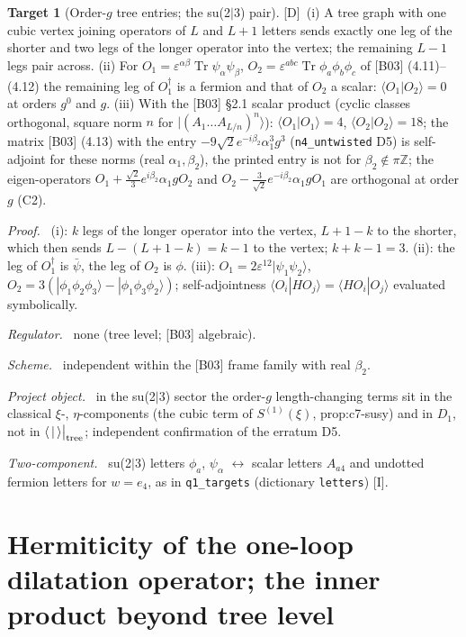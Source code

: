 \documentclass[11pt]{article}
\theoremstyle{definition}
\newtheorem{target}{Target}
\newcommand{\Tr}{\operatorname{Tr}}
\newcommand{\Dl}{\textup{[D]}}
\newcommand{\Il}{\textup{[I]}}
\newcommand{\tree}{\big|_{\rm tree}}
\newcommand{\fld}[1]{\par\textit{#1.}\ }
\begin{document}
\begin{target}[Order-$g$ tree entries; the su(2$|$3) pair]\label{t:legs}
\Dl\ (i) A tree graph with one cubic vertex joining operators of $L$ and $L+1$ letters sends exactly one leg of the shorter and two legs of the longer operator into the vertex; the remaining $L-1$ legs pair across. (ii) For $O_1=\varepsilon^{\alpha\beta}\Tr\psi_\alpha\psi_\beta$, $O_2=\varepsilon^{abc}\Tr\phi_a\phi_b\phi_c$ of [B03] (4.11)--(4.12) the remaining leg of $O_1^\dagger$ is a fermion and that of $O_2$ a scalar: $\langle O_1|O_2\rangle=0$ at orders $g^0$ and $g$. (iii) With the [B03] \S2.1 scalar product (cyclic classes orthogonal, square norm $n$ for $|(A_1\dots A_{L/n})^n\rangle$): $\langle O_1|O_1\rangle=4$, $\langle O_2|O_2\rangle=18$; the matrix [B03] (4.13) with the entry $-9\sqrt2e^{-i\beta_2}\alpha_1^3g^3$ (\texttt{n4\_untwisted} D5) is self-adjoint for these norms (real $\alpha_1,\beta_2$), the printed entry is not for $\beta_2\notin\pi\mathbb Z$; the eigen-operators $O_1+\tfrac{\sqrt2}3e^{i\beta_2}\alpha_1gO_2$ and $O_2-\tfrac3{\sqrt2}e^{-i\beta_2}\alpha_1gO_1$ are orthogonal at order $g$ (C2).
\fld{Proof} (i): $k$ legs of the longer operator into the vertex, $L+1-k$ to the shorter, which then sends $L-(L+1-k)=k-1$ to the vertex; $k+k-1=3$. (ii): the leg of $O_1^\dagger$ is $\bar\psi$, the leg of $O_2$ is $\phi$. (iii): $O_1=2\varepsilon^{12}|\psi_1\psi_2\rangle$, $O_2=3(|\phi_1\phi_2\phi_3\rangle-|\phi_1\phi_3\phi_2\rangle)$; self-adjointness $\langle O_i|HO_j\rangle=\langle HO_i|O_j\rangle$ evaluated symbolically.
\fld{Regulator} none (tree level; [B03] algebraic). \fld{Scheme} independent within the [B03] frame family with real $\beta_2$.
\fld{Project object} in the su(2$|$3) sector the order-$g$ length-changing terms sit in the classical $\xi$-, $\eta$-components (the cubic term of $S^{(1)}(\xi)$, prop:c7-susy) and in $D_1$, not in $\langle\,|\,\rangle\tree$; independent confirmation of the erratum D5.
\fld{Two-component} su(2$|$3) letters $\phi_a$, $\psi_\alpha$ $\leftrightarrow$ scalar letters $A_{a4}$ and undotted fermion letters for $w=e_4$, as in \texttt{q1\_targets} (dictionary \texttt{letters}) \Il.
\end{target}

\section{Hermiticity of the one-loop dilatation operator; the inner product beyond tree level}
\end{document}
